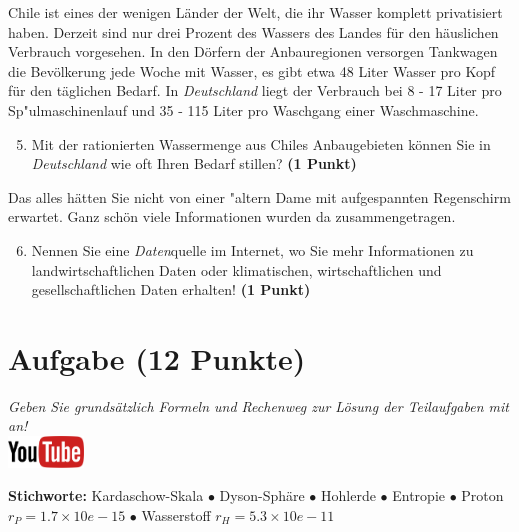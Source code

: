 \documentclass[a4paper, 9pt]{scrartcl}\usepackage[]{graphicx}\usepackage[]{xcolor}
\begin{document}
Chile ist eines der wenigen Länder der Welt, die ihr Wasser komplett privatisiert haben. Derzeit sind nur drei Prozent des Wassers des Landes für den häuslichen Verbrauch vorgesehen. In den Dörfern der Anbauregionen versorgen Tankwagen die Bevölkerung jede Woche mit Wasser, es gibt etwa 48 Liter Wasser pro Kopf für den täglichen Bedarf. In \textit{Deutschland} liegt der Verbrauch bei 8 - 17 Liter pro Sp{"u}lmaschinenlauf und 35 - 115 Liter pro Waschgang einer Waschmaschine.

\begin{enumerate}
  \setcounter{enumi}{4}
\item Mit der rationierten Wassermenge aus Chiles Anbaugebieten können Sie in \textit{Deutschland} wie oft Ihren Bedarf stillen? \textbf{(1 Punkt)}
\end{enumerate}

Das alles hätten Sie nicht von einer {"a}ltern Dame mit aufgespannten Regenschirm erwartet. Ganz schön viele Informationen wurden da zusammengetragen.

\begin{enumerate}
  \setcounter{enumi}{5}  
  \item Nennen Sie eine \textit{Daten}quelle im Internet, wo Sie mehr Informationen zu landwirtschaftlichen Daten oder klimatischen, wirtschaftlichen und gesellschaftlichen Daten erhalten! \textbf{(1 Punkt)}
\end{enumerate} 
\clearpage

\section{Aufgabe \hfill (12 Punkte)}

\textit{Geben Sie grunds{\"a}tzlich Formeln und Rechenweg zur L{\"o}sung der
  Teilaufgaben mit an!} \\[1Ex]

\hfill\href{https://youtu.be/WZSxntiNF8s}{\includegraphics[width = 2cm]{img/youtube}} %
\hspace{2Ex}

{\tiny\textbf{Stichworte:} Kardaschow-Skala $\bullet$ Dyson-Sphäre $\bullet$ Hohlerde $\bullet$ Entropie $\bullet$ Proton $r_P = 1.7 \times 10e-15$ $\bullet$ Wasserstoff $r_H = 5.3\times 10e-11$}
\end{document}
